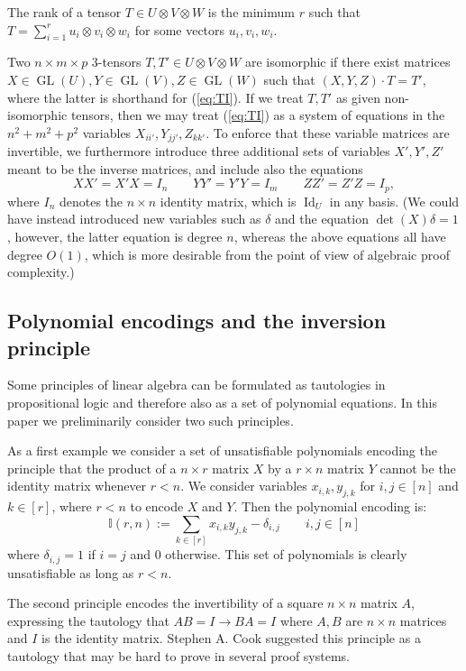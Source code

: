 \documentclass[10pt,a4paper]{article}
\theoremstyle{definition}
\DeclareMathOperator{\GL}{GL}
\DeclareMathOperator{\Id}{Id}
\begin{document}
The rank of a tensor $T \in U \otimes V \otimes W$ is the minimum $r$ such that $T = \sum_{i=1}^r u_i \otimes v_i \otimes w_i$ for some vectors $u_i, v_i, w_i$. 

Two $n \times m \times p$ 3-tensors $T,T' \in U \otimes V \otimes W$ are isomorphic if there exist matrices $X \in \GL(U), Y \in \GL(V), Z \in \GL(W)$ such that $(X,Y,Z) \cdot T = T'$, where the latter is shorthand for (\ref{eq:TI}).
If we treat $T,T'$ as given non-isomorphic tensors, then we may treat (\ref{eq:TI}) as a system of equations in the $n^2 + m^2 + p^2$ variables $X_{ii'}, Y_{jj'}, Z_{kk'}$. To enforce that these variable matrices are invertible, we furthermore introduce three additional sets of variables $X', Y', Z'$ meant to be the inverse matrices, and include also the equations 
\[
XX' = X'X = I_n \qquad YY' = Y'Y = I_m \qquad ZZ' = Z' Z = I_p,
\]
where $I_n$ denotes the $n \times n$ identity matrix, which is $\Id_U$ in any basis. (We could have instead introduced new variables such as $\delta$ and the equation $\det(X) \delta = 1$, however, the latter equation is degree $n$, whereas the above equations all have degree $O(1)$, which is more desirable from the point of view of algebraic proof complexity.)

\subsection{Polynomial encodings and the inversion principle} \label{sec:prelim:inv}
Some  principles of linear algebra can be formulated as tautologies in propositional logic and therefore also as a set of polynomial equations.
In this paper we preliminarily consider two such principles. 

\medskip

 As a first example we consider a set of unsatisfiable polynomials encoding the principle that  the product of a $n\times r$ matrix $X$ by a $r\times n$ matrix $Y$ cannot be the identity matrix whenever $r<n$.  We consider variables $x_{i,k},y_{j,k}$ for $i,j\in [n]$ and $k\in [r]$, where $r< n$ to encode $X$ and $Y$. Then the polynomial encoding is:
$$\mathbb I(r,n) := \sum_{k\in[r]} x_{i,k}y_{j,k}-\delta_{i,j} \quad \quad i,j\in [n]$$
where $\delta_{i,j}=1$ if $i=j$ and $0$ otherwise. This set of polynomials is clearly unsatisfiable as long as $r<n$. 

\medskip

 The second principle encodes the invertibility of a square $n\times n$ matrix $A$,  expressing the tautology that
 $AB=I \rightarrow BA=I$ where $A,B$ are $n\times n$ matrices and $I$ is the identity matrix. Stephen A. Cook suggested this principle as a tautology that may be hard to prove in several proof systems. 
 
\end{document}
